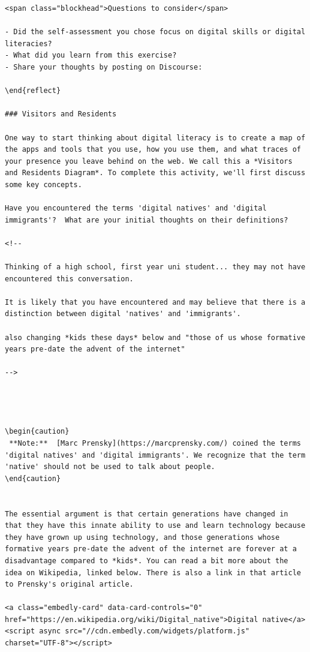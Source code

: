 \documentclass[
]{book}
\theoremstyle{definition}
\theoremstyle{definition}
\theoremstyle{definition}
\theoremstyle{definition}
\theoremstyle{remark}
\begin{document}
\begin{verbatim}
<span class="blockhead">Questions to consider</span>

- Did the self-assessment you chose focus on digital skills or digital literacies?
- What did you learn from this exercise?
- Share your thoughts by posting on Discourse:

\end{reflect}

### Visitors and Residents

One way to start thinking about digital literacy is to create a map of the apps and tools that you use, how you use them, and what traces of your presence you leave behind on the web. We call this a *Visitors and Residents Diagram*. To complete this activity, we'll first discuss some key concepts.

Have you encountered the terms 'digital natives' and 'digital immigrants'?  What are your initial thoughts on their definitions?

<!--

Thinking of a high school, first year uni student... they may not have encountered this conversation.

It is likely that you have encountered and may believe that there is a distinction between digital 'natives' and 'immigrants'.

also changing *kids these days* below and "those of us whose formative years pre-date the advent of the internet"

-->




\begin{caution}
 **Note:**  [Marc Prensky](https://marcprensky.com/) coined the terms 'digital natives' and 'digital immigrants'. We recognize that the term 'native' should not be used to talk about people.
\end{caution}


The essential argument is that certain generations have changed in that they have this innate ability to use and learn technology because they have grown up using technology, and those generations whose formative years pre-date the advent of the internet are forever at a disadvantage compared to *kids*. You can read a bit more about the idea on Wikipedia, linked below. There is also a link in that article to Prensky's original article.

<a class="embedly-card" data-card-controls="0" href="https://en.wikipedia.org/wiki/Digital_native">Digital native</a>
<script async src="//cdn.embedly.com/widgets/platform.js" charset="UTF-8"></script>


\end{verbatim}
\end{document}
